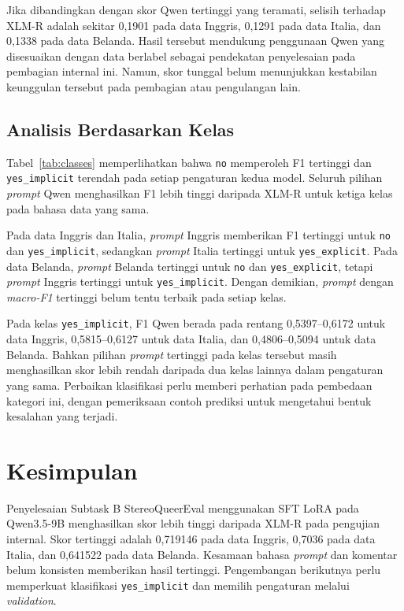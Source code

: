 \documentclass[11pt]{article}
\begin{document}
Jika dibandingkan dengan skor Qwen tertinggi yang teramati, selisih terhadap XLM-R adalah sekitar 0,1901 pada data Inggris, 0,1291 pada data Italia, dan 0,1338 pada data Belanda. Hasil tersebut mendukung penggunaan Qwen yang disesuaikan dengan data berlabel sebagai pendekatan penyelesaian pada pembagian internal ini. Namun, skor tunggal belum menunjukkan kestabilan keunggulan tersebut pada pembagian atau pengulangan lain.

\subsection{Analisis Berdasarkan Kelas}
Tabel~\ref{tab:classes} memperlihatkan bahwa \texttt{no} memperoleh F1 tertinggi dan \texttt{yes\_implicit} terendah pada setiap pengaturan kedua model. Seluruh pilihan \textit{prompt} Qwen menghasilkan F1 lebih tinggi daripada XLM-R untuk ketiga kelas pada bahasa data yang sama.



Pada data Inggris dan Italia, \textit{prompt} Inggris memberikan F1 tertinggi untuk \texttt{no} dan \nolinkurl{yes_implicit}, sedangkan \textit{prompt} Italia tertinggi untuk \nolinkurl{yes_explicit}. Pada data Belanda, \textit{prompt} Belanda tertinggi untuk \texttt{no} dan \nolinkurl{yes_explicit}, tetapi \textit{prompt} Inggris tertinggi untuk \nolinkurl{yes_implicit}. Dengan demikian, \textit{prompt} dengan \textit{macro-F1} tertinggi belum tentu terbaik pada setiap kelas.

Pada kelas \texttt{yes\_implicit}, F1 Qwen berada pada rentang 0,5397--0,6172 untuk data Inggris, 0,5815--0,6127 untuk data Italia, dan 0,4806--0,5094 untuk data Belanda. Bahkan pilihan \textit{prompt} tertinggi pada kelas tersebut masih menghasilkan skor lebih rendah daripada dua kelas lainnya dalam pengaturan yang sama. Perbaikan klasifikasi perlu memberi perhatian pada pembedaan kategori ini, dengan pemeriksaan contoh prediksi untuk mengetahui bentuk kesalahan yang terjadi.

\section{Kesimpulan}
Penyelesaian Subtask B StereoQueerEval menggunakan SFT LoRA pada Qwen3.5-9B menghasilkan skor lebih tinggi daripada XLM-R pada pengujian internal. Skor tertinggi adalah 0,719146 pada data Inggris, 0,7036 pada data Italia, dan 0,641522 pada data Belanda. Kesamaan bahasa \textit{prompt} dan komentar belum konsisten memberikan hasil tertinggi. Pengembangan berikutnya perlu memperkuat klasifikasi \texttt{yes\_implicit} dan memilih pengaturan melalui \textit{validation}.
\end{document}
